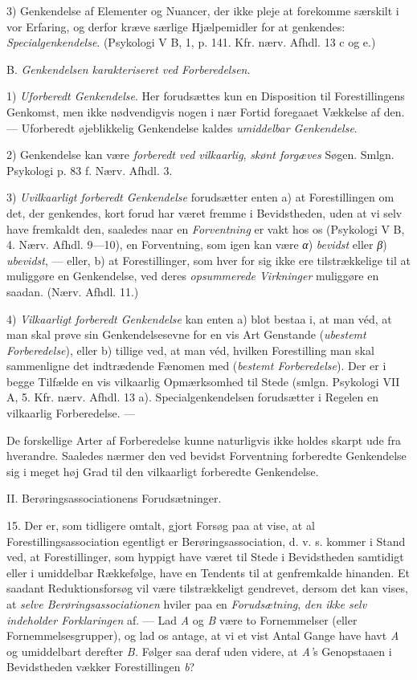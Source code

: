 \documentclass[12pt,a4paper,openany]{book}
\newcommand{\opage}[1]{\marginnote{\footnotesize\textit{[#1]}}}
\begin{document}
3) Genkendelse af Elementer og Nuancer, der ikke pleje at forekomme særskilt i
\setcounter{footnote}{0}%
\opage{36}vor Erfaring, og derfor kræve særlige Hjælpemidler for at genkendes:
\emph{Specialgenkendelse}. (Psykologi V B, 1, p. 141. Kfr. nærv. Afhdl. 13 c og e.)

B. \emph{Genkendelsen karakteriseret ved Forberedelsen}.

1) \emph{Uforberedt Genkendelse}. Her forudsættes kun en Disposition til
Forestillingens Genkomst, men ikke nødvendigvis nogen i nær Fortid foregaaet
Vækkelse af den. --- Uforberedt øjeblikkelig Genkendelse kaldes
\emph{umiddelbar Genkendelse}.

2) Genkendelse kan være \emph{forberedt ved vilkaarlig}, \emph{skønt forgæves}
Søgen. Smlgn. Psykologi p. 83 f. Nærv. Afhdl. 3.

3) \emph{Uvilkaarligt forberedt Genkendelse} forudsætter enten a) at
Forestillingen om det, der genkendes, kort forud har været fremme i
Bevidstheden, uden at vi selv have fremkaldt den, saaledes naar en
\emph{Forventning} er vakt hos os (Psykologi V B, 4. Nærv. Afhdl. 9---10), en
Forventning, som igen kan være \textit{α}) \emph{bevidst} eller \textit{β})
\emph{ubevidst}, --- eller, b) at Forestillinger, som hver for sig ikke ere
tilstrækkelige til at muliggøre en Genkendelse, ved deres \emph{opsummerede
Virkninger} muliggøre en saadan. (Nærv. Afhdl. 11.)

4) \emph{Vilkaarligt forberedt Genkendelse} kan enten a) blot bestaa i, at man
véd, at man skal prøve sin Genkendelsesevne for en vis Art Genstande
(\emph{ubestemt Forberedelse}), eller b) tillige ved, at man véd, hvilken
Forestilling man skal sammenligne det indtrædende Fænomen med (\emph{bestemt
Forberedelse}). Der er i begge Tilfælde en vis vilkaarlig Opmærksomhed til
Stede (smlgn. Psykologi VII A, 5. Kfr. nærv. Afhdl. 13 a). Specialgenkendelsen
forudsætter i Regelen en vilkaarlig Forberedelse. ---

De forskellige Arter af Forberedelse kunne naturligvis ikke holdes skarpt ude
fra hverandre. Saaledes nærmer den ved bevidst Forventning forberedte
Genkendelse sig i meget høj Grad til den vilkaarligt forberedte Genkendelse.

\begin{center}\large II. Berøringsassociationens Forudsætninger.\end{center}

15. Der er, som tidligere omtalt, gjort Forsøg paa at vise, at al
Forestillingsassociation egentligt er Berøringsassociation, d. v. s. kommer i
Stand ved, at Forestillinger, som hyppigt have været til Stede i Bevidstheden
samtidigt eller i umiddelbar Rækkefølge, have en Tendents til at genfremkalde
hinanden. Et saadant Reduktionsforsøg vil være tilstrækkeligt gendrevet, dersom
det kan vises, at \emph{selve Berøringsassociationen} hviler paa en
\emph{Forudsætning}, \emph{den ikke selv indeholder Forklaringen} af. --- Lad
\textit{A} og \textit{B} være to Fornemmelser (eller Fornemmelsesgrupper), og
lad os antage, at vi et vist Antal Gange have havt \textit{A} og umiddelbart
derefter \textit{B.} Følger saa deraf uden videre, at \textit{A'}s Genopstaaen
i Bevidstheden vækker Forestillingen \textit{b}?
\end{document}
